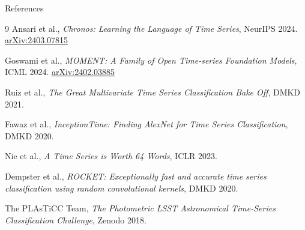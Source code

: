 \documentclass[aspectratio=169, 10pt]{beamer}
\begin{document}
\begin{frame}{References}
  \footnotesize
  \begin{thebibliography}{9}
      Ansari et al., \textit{Chronos: Learning the Language of Time Series},
      NeurIPS 2024. \href{https://arxiv.org/abs/2403.07815}{arXiv:2403.07815}

      Goswami et al., \textit{MOMENT: A Family of Open Time-series Foundation Models},
      ICML 2024. \href{https://arxiv.org/abs/2402.03885}{arXiv:2402.03885}

      Ruiz et al., \textit{The Great Multivariate Time Series Classification Bake Off},
      DMKD 2021.

      Fawaz et al., \textit{InceptionTime: Finding AlexNet for Time Series Classification},
      DMKD 2020.

      Nie et al., \textit{A Time Series is Worth 64 Words},
      ICLR 2023.

      Dempster et al., \textit{ROCKET: Exceptionally fast and accurate time series
      classification using random convolutional kernels}, DMKD 2020.

      The PLAsTiCC Team, \textit{The Photometric LSST Astronomical Time-Series
      Classification Challenge}, Zenodo 2018.
  \end{thebibliography}
\end{frame}
\end{document}
